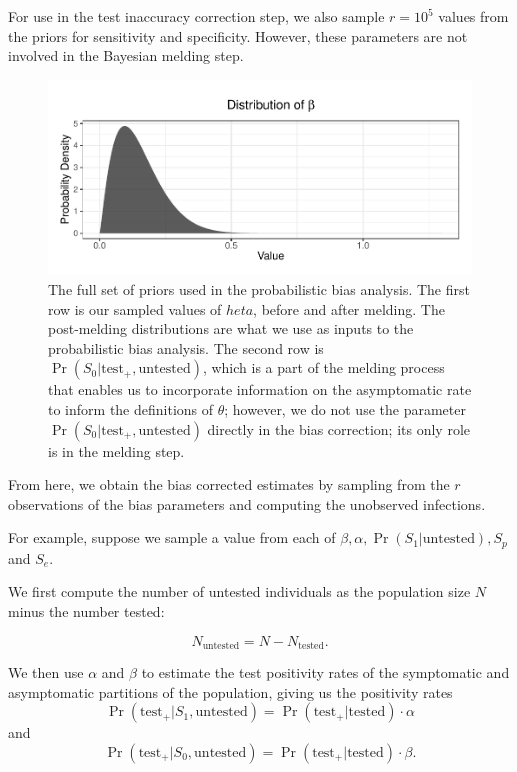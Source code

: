 \documentclass[12pt,twoside]{smiththesis}
\begin{document}
For use in the test inaccuracy correction step, we also sample \(r=10^5\) values from the priors for sensitivity and specificity. However, these parameters are not involved in the Bayesian melding step.
\begin{figure}
\includegraphics[width=1\linewidth]{thesis_files/figure-latex/unnamed-chunk-56-1} \caption{\label{fig:melded-all-together}The full set of priors used in the probabilistic bias analysis. The first row is our sampled values of $  heta$, before and after melding. The post-melding distributions are what we use as inputs to the probabilistic bias analysis. The second row is $\Pr(S_0|\text{test}_+, \text{untested})$, which is a part of the melding process that enables us to incorporate information on the asymptomatic rate to inform the definitions of $\theta$; however, we do not use the parameter $\Pr(S_0|\text{test}_+, \text{untested})$ directly in the bias correction; its only role is in the melding step.}\label{fig:unnamed-chunk-56}
\end{figure}
From here, we obtain the bias corrected estimates by sampling from the \(r\) observations of the bias parameters and computing the unobserved infections.

For example, suppose we sample a value from each of \(\beta,\alpha,\Pr(S_1|\text{untested}), S_p\) and \(S_e\).

We first compute the number of untested individuals as the population size \(N\) minus the number tested:

\[ N_{\text{untested}} =  N - N_{\text{tested}} .\]

We then use \(\alpha\) and \(\beta\) to estimate the test positivity rates of the symptomatic and asymptomatic partitions of the population, giving us the positivity rates
\[ \Pr( \text{test}_+ | S_1, \text{untested})  = \Pr( \text{test}_+ | \text{tested}) \cdot  \alpha  \]
and
\[ \Pr( \text{test}_+ | S_0, \text{untested})  = \Pr( \text{test}_+ | \text{tested}) \cdot  \beta. \]
\end{document}
